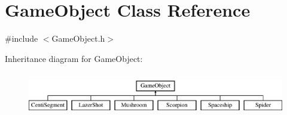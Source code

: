 \hypertarget{class_game_object}{}\section{Game\+Object Class Reference}
\label{class_game_object}


{\ttfamily \#include $<$Game\+Object.\+h$>$}

Inheritance diagram for Game\+Object\+:\begin{figure}[H]
\begin{center}
\leavevmode
\includegraphics[height=1.924399cm]{class_game_object}
\end{center}
\end{figure}
